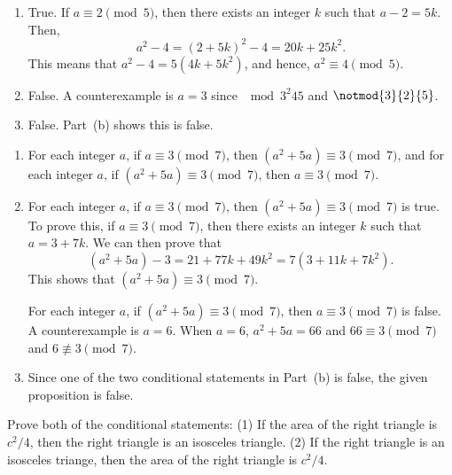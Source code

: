 \begin{list}{\bf{\ref{exer:sec32-4}.}}
\item \begin{enumerate}  
\item True.  If $a \equiv 2 \pmod 5$, then there exists an integer $k$ such that $a - 2 = 5k$.  
Then, 
\[
a^2 - 4  = \left( 2 + 5k \right)^2 - 4  = 20k + 25k^2.  
\]
This means that $a^2 - 4 = 5 \left( 4k + 5k^2 \right)$, and hence, $a^2 \equiv 4 \pmod 5$.

\item False.  A counterexample is $a = 3$ since $\mod{3^2}{4}{5}$ and $\notmod{3}{2}{5}$.

\item False.  Part~(b) shows this is false.
\end{enumerate}
\end{list}


\begin{list}{\bf{\ref{exer:sec32-congmod7}.}}
\item \begin{enumerate}
\item For each integer $a$, if $a \equiv 3 \pmod 7$, then $(a^2 + 5a) \equiv 3 \pmod 7$, and for each integer $a$, if $(a^2 + 5a) \equiv 3 \pmod 7$, then $a \equiv 3 \pmod 7$.

\item For each integer $a$, if $a \equiv 3 \pmod 7$, then $(a^2 + 5a) \equiv 3 \pmod 7$ is true.  To prove this, if $a \equiv 3 \pmod 7$, then there exists an integer $k$ such that 
$a = 3 + 7k$.  We can then prove that
\[
\left( a^2 + 5a \right) - 3 = 21 + 77k + 49k^2 = 7(3 + 11k + 7k^2).
\]
This shows that $(a^2 + 5a) \equiv 3 \pmod 7$.

For each integer $a$, if $(a^2 + 5a) \equiv 3 \pmod 7$, then $a \equiv 3 \pmod 7$ is false.  A counterexample is $a = 6$.  When $a = 6$, $a^2 + 5a = 66$ and 
$66 \equiv 3 \pmod 7$ and $6 \not \equiv 3 \pmod 7$.

\item Since one of the two conditional statements in Part~(b) is false, the given proposition is false.
\end{enumerate}

\end{list}

\begin{list}{\bf{\ref{exer:sec32-6}.}}
\item Prove both of the conditional statements:  (1) If the area of the right triangle is 
$c^2/4$, then the right triangle is an isosceles triangle.  (2)  If the right triangle is an isosceles triange, then the area of the right triangle is $c^2/4$.
\end{list}



